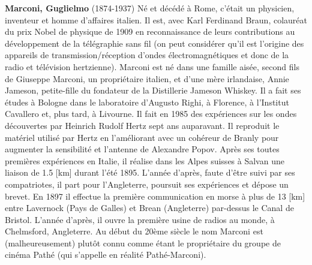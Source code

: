 \textbf{Marconi, Guglielmo} (1874-1937) Né et décédé à Rome, c'était un physicien, inventeur et homme d'affaires italien. Il est, avec Karl Ferdinand Braun, colauréat du prix Nobel de physique de 1909 en reconnaissance de leurs contributions au développement de la télégraphie sans fil (on peut considérer qu'il est l'origine des appareils de transmission/réception d'ondes électromagnétiques et donc de la radio et télévision hertzienne). Marconi est né dans une famille aisée, second fils de Giuseppe Marconi, un propriétaire italien, et d'une mère irlandaise, Annie Jameson, petite-fille du fondateur de la Distillerie Jameson Whiskey. Il a fait ses études à Bologne dans le laboratoire d'Augusto Righi, à Florence, à l'Institut Cavallero et, plus tard, à Livourne. Il fait en 1985 des expériences sur les ondes découvertes par Heinrich Rudolf Hertz sept ans auparavant. Il reproduit le matériel utilisé par Hertz en l'améliorant avec un cohéreur de Branly pour augmenter la sensibilité et l'antenne de Alexandre Popov. Après ses toutes premières expériences en Italie, il réalise dans les Alpes suisses à Salvan une liaison de 1.5 [km] durant l'été 1895. L'année d'après, faute d'être suivi par ses compatriotes, il part pour l'Angleterre, poursuit ses expériences et dépose un brevet. En 1897 il effectue la première communication en morse à plus de 13 [km] entre Lavernock (Pays de Galles) et Brean (Angleterre) par-dessus le Canal de Bristol. L'année d'après, il ouvre la première usine de radios au monde, à Chelmsford, Angleterre. Au début du 20ème siècle le nom Marconi est (malheureusement) plutôt connu comme étant le propriétaire du groupe de cinéma Pathé (qui s'appelle en réalité Pathé-Marconi).

